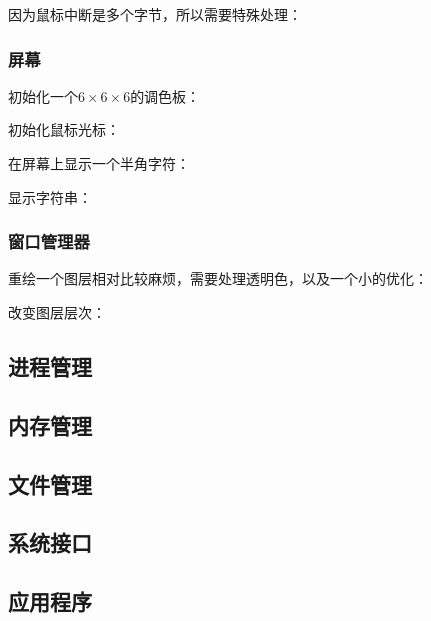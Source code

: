 因为鼠标中断是多个字节，所以需要特殊处理：
{\linespread{1}}

\subsubsection{屏幕}
\label{subs:屏幕}

初始化一个$6\times6\times6$的调色板：
{\linespread{1}}

初始化鼠标光标：
{\linespread{1}}

在屏幕上显示一个半角字符：
{\linespread{1}}

显示字符串：
{\linespread{1}}

\subsubsection{窗口管理器}
\label{subs:窗口管理器}

{\linespread{1}}
{\linespread{1}}

重绘一个图层相对比较麻烦，需要处理透明色，以及一个小的优化：
{\linespread{1}}

改变图层层次：
{\linespread{1}}



\subsection{进程管理}
\label{sub:进程管理}

\subsection{内存管理}
\label{sub:内存管理}

\subsection{文件管理}
\label{sub:文件管理}

\subsection{系统接口}
\label{sub:系统接口}

\subsection{应用程序}
\label{sub:应用程序}
